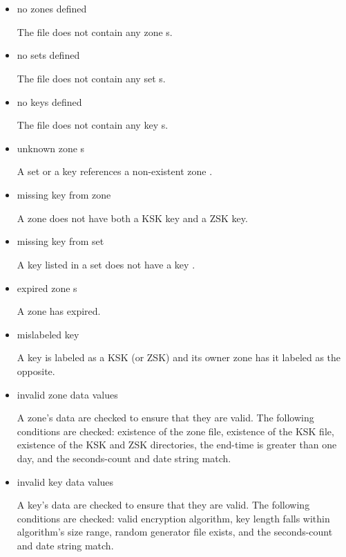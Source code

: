 \begin{itemize}

\item no zones defined\verb" "

The  file does not contain any zone s.

\item no sets defined\verb" "

The  file does not contain any set s.

\item no keys defined\verb" "

The  file does not contain any key s.

\item unknown zone s\verb" "

A set  or a key  references a non-existent zone
.

\item missing key from zone \verb" "

A zone  does not have both a KSK key and a ZSK key.

\item missing key from set \verb" "

A key listed in a set  does not have a key .

\item expired zone s\verb" "

A zone has expired.

\item mislabeled key\verb" "

A key is labeled as a KSK (or ZSK) and its owner zone has it labeled as the
opposite.

\item invalid zone data values\verb" "

A zone's  data are checked to ensure that they are valid.  The
following conditions are checked:  existence of the zone file, existence of
the KSK file, existence of the KSK and ZSK directories, the end-time is
greater than one day, and the seconds-count and date string match.

\item invalid key data values\verb" "

A key's  data are checked to ensure that they are valid.  The
following conditions are checked:  valid encryption algorithm, key length
falls within algorithm's size range, random generator file exists, and the
seconds-count and date string match.

\end{itemize}

